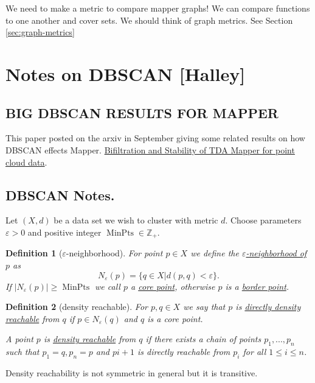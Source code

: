 \documentclass{article}
\def\minpts{\operatorname{MinPts}}
\def\Z{\mathbb{Z}}
\newtheorem{definition}{Definition}[section]
\begin{document}
We need to make a metric to compare mapper graphs! We can compare functions to one another and cover sets. We should think of graph metrics. See Section \ref{sec:graph-metrics}

\section{Notes on DBSCAN [Halley]}

\subsection{BIG DBSCAN RESULTS FOR MAPPER}
This paper posted on the arxiv in September giving some related results on how DBSCAN effects Mapper.
\href{https://arxiv.org/pdf/2409.17360}{Bifiltration and Stability of TDA Mapper for point cloud data}.

\subsection{DBSCAN Notes.}

Let $(X,d)$ be a data set we wish to cluster with metric $d$. Choose parameters $\varepsilon>0$ and positive integer $\minpts\in\Z_+$.

\begin{definition}[$\varepsilon$-neighborhood]
    For point $p\in X$ we define the \underline{$\varepsilon$-neighborhood of $p$} as 
    $$N_\varepsilon(p)=\{q\in X | d(p,q)<\varepsilon\}.$$
    If $|N_\varepsilon(p)|\geq \minpts$ we call $p$ a \underline{core point}, otherwise $p$ is a \underline{border point}.
\end{definition}
\begin{definition}[density reachable]
    For $p,q\in X$ we say that $p$ is \underline{directly density reachable} from $q$ if $p\in N_\varepsilon(q)$ and $q$ is a core point.
    
    \noindent A point $p$ is \underline{density reachable} from $q$ if there exists a chain of points $p_1,...,p_n$ such that $p_1=q, p_n=p$ and $p{i+1}$ is directly reachable from $p_i$ for all $1\leq i\leq n$.
\end{definition}
Density reachability is not symmetric in general but it is transitive.
\end{document}
